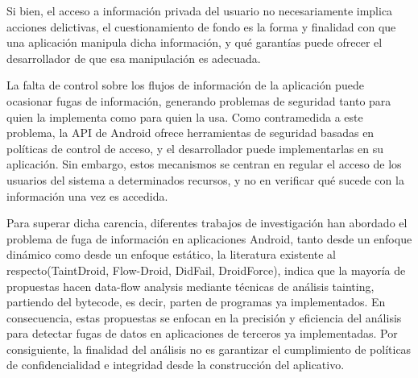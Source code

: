 Si bien, el acceso a información privada del usuario no necesariamente
implica acciones delictivas, el cuestionamiento de
fondo es la forma y finalidad con que una aplicación manipula dicha información,
y qué garantías puede ofrecer el desarrollador de que esa manipulación es
adecuada.

La falta de control sobre los flujos de información de la aplicación puede
ocasionar fugas de información, generando problemas de seguridad tanto para
quien la implementa como para quien la usa.\newline
Como contramedida a este problema, la API de Android ofrece herramientas de
seguridad basadas en políticas de control de acceso, y el desarrollador puede
implementarlas en su aplicación. Sin embargo, estos mecanismos se centran en
regular el acceso de los usuarios del sistema a determinados recursos, y no en
verificar qué sucede con la información una vez es accedida. 

Para superar dicha carencia, diferentes trabajos de investigación han abordado
el problema de fuga de información en aplicaciones Android, tanto desde un enfoque
dinámico como desde un enfoque estático, la literatura existente al
respecto(TaintDroid\cite{TaintDroid}, Flow-Droid\cite{FlowDroid-Thesis},
DidFail\cite{DidFail}, DroidForce\cite{DroidForce}), indica que la mayoría de
propuestas hacen data-flow analysis mediante técnicas de análisis 
tainting, partiendo del bytecode, es decir, parten de programas ya
implementados.
En consecuencia, estas propuestas se enfocan en la precisión y eficiencia
del análisis para detectar fugas de datos en aplicaciones de terceros ya implementadas. Por consiguiente,
la finalidad del análisis no es garantizar el cumplimiento de políticas de
confidencialidad e integridad desde la construcción del aplicativo.

